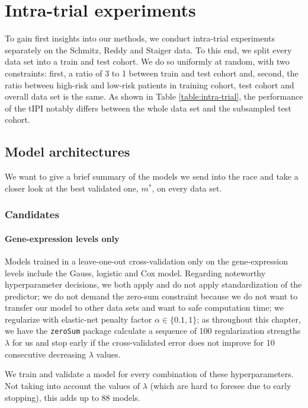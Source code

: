 \section{Intra-trial experiments}\label{sec:intra-trial}

To gain first insights into our methods, we conduct intra-trial experiments separately on the 
Schmitz, Reddy and Staiger data. To this end, we split every data set into a train and test 
cohort. We do so uniformly at random, with two constraints: first, a ratio of 3 to 1 between train 
and test cohort and, second, the ratio between high-risk and low-risk patients in training cohort, 
test cohort and overall data set is the same. As shown in Table \ref{table:intra-trial}, the 
performance of the tIPI notably differs between the whole data set and the subsampled test cohort. 



\subsection{Model architectures}

We want to give a brief summary of the models we send into the race and take a closer look at the 
best validated one, $m^*$, on every data set.

\subsubsection{Candidates}

\paragraph{Gene-expression levels only}
Models trained in a leave-one-out cross-validation only on the gene-expression levels include the 
Gauss, logistic and Cox model. Regarding noteworthy hyperparameter decisions, we both apply and 
do not apply standardization of the predictor; we do not demand the zero-sum constraint 
because we do not want to transfer our model to other data sets and want to safe computation time;
we regularize with elastic-net penalty factor $\alpha \in \{ \num{0.1}, 1 \}$; as throughout this 
chapter, we have the \texttt{zeroSum} package calculate a sequence of \num{100} regularization strengths 
$\lambda$ for us and stop early if the cross-validated error does not improve for \num{10} 
consecutive decreasing $\lambda$ values.

We train and validate a model for every combination of these hyperparameters.
Not taking into account the values of $\lambda$ (which are hard to foresee due to early stopping), 
this adds up to \num{88} models.

